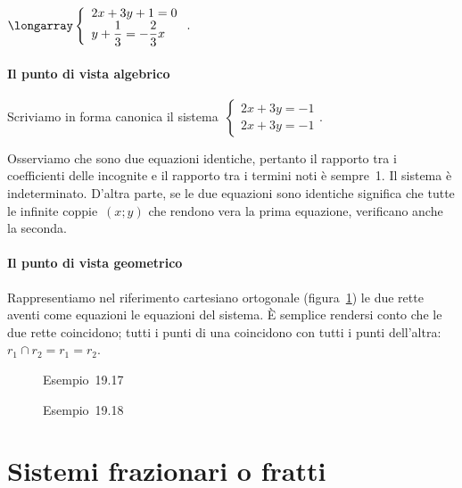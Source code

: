 \begin{exrig}
 \begin{esempio}
$\longarray\left\{\begin{array}{l}2x+3y+1=0\\y+\dfrac{1}{3}=-{\dfrac{2}{3}}x\end{array}\right..$

 \paragraph{Il punto di vista algebrico}
 Scriviamo in forma canonica il sistema~$\left\{\begin{array}{l}2x+3y=-1\\2x+3y=-1\end{array}\right.$.

 Osserviamo che sono due equazioni identiche, pertanto il rapporto tra i
coefficienti delle incognite e il rapporto tra i termini noti è
sempre~1. Il sistema è indeterminato. D'altra parte,
se le due equazioni sono identiche significa che tutte le infinite
coppie~$(x;y)$ che rendono vera la prima equazione, verificano anche la
seconda.

\paragraph{Il punto di vista geometrico}
Rappresentiamo nel riferimento cartesiano ortogonale (figura~\ref{fig:19.2}) le due rette aventi
come equazioni le equazioni del sistema. È semplice
rendersi conto che le due rette coincidono; tutti i punti di una
coincidono con tutti i punti dell'altra:~$r_{1}\cap r_{2}=r_{1}=r_{2}$.

\begin{figure}[htbp]
\begin{minipage}{0.5\textwidth}
\centering

\caption{Esempio~19.17}\label{fig:19.1}
\end{minipage}\hfill
\begin{minipage}{0.5\textwidth}
\centering

\caption{Esempio~19.18}\label{fig:19.2}
\end{minipage}
\end{figure}
 \end{esempio}
 \end{exrig}

\ovalbox{\risolvii \ref{ese:19.41}, \ref{ese:19.42}, \ref{ese:19.43}, \ref{ese:19.44}, \ref{ese:19.45}}

\section{Sistemi frazionari o fratti}

